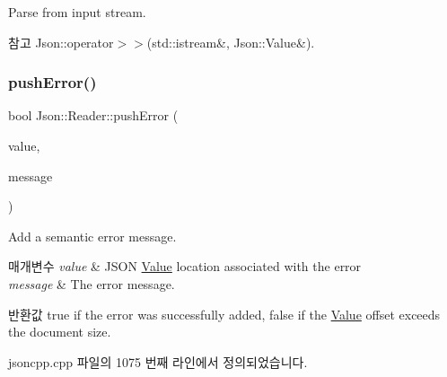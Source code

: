 Parse from input stream. 

\begin{DoxySeeAlso}{참고}
Json\+::operator$>$$>$(std\+::istream\&, Json\+::\+Value\&). 
\end{DoxySeeAlso}
\mbox{\label{class_json_1_1_reader_af5fa7099083f01706635ade1d0f8ddb5}} 
\subsubsection{\texorpdfstring{push\+Error()}{pushError()}\hspace{0.1cm}{\footnotesize\ttfamily [1/2]}}
{\footnotesize\ttfamily bool Json\+::\+Reader\+::push\+Error (\begin{DoxyParamCaption}\item[{const \hyperlink{class_json_1_1_value}{Value} \&}]{value,  }\item[{const \hyperlink{json_8h_a1e723f95759de062585bc4a8fd3fa4be}{J\+S\+O\+N\+C\+P\+P\+\_\+\+S\+T\+R\+I\+NG} \&}]{message }\end{DoxyParamCaption})}



Add a semantic error message. 


\begin{DoxyParams}{매개변수}
{\em value} & J\+S\+ON \hyperlink{class_json_1_1_value}{Value} location associated with the error \\
\hline
{\em message} & The error message. \\
\hline
\end{DoxyParams}
\begin{DoxyReturn}{반환값}
{\ttfamily true} if the error was successfully added, {\ttfamily false} if the \hyperlink{class_json_1_1_value}{Value} offset exceeds the document size. 
\end{DoxyReturn}


jsoncpp.\+cpp 파일의 1075 번째 라인에서 정의되었습니다.


